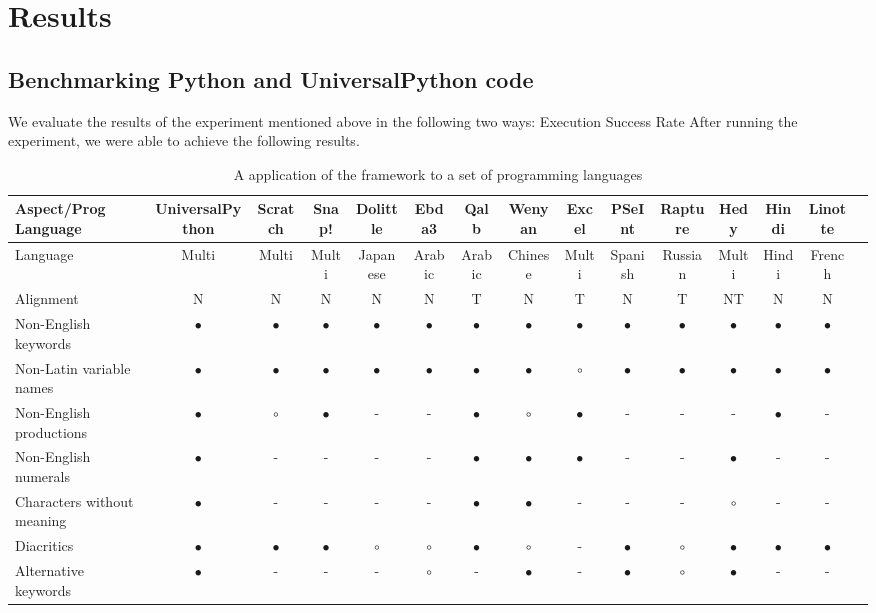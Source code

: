 \documentclass[conference]{IEEEtran}
\begin{document}
\section{Results}


\subsection{Benchmarking Python and UniversalPython code}

We evaluate the results of the experiment mentioned above in the following two ways:
Execution Success Rate After running the experiment, we were able to achieve the following results.


\begin{table}[t]
    \caption{A application of the framework to a set of programming languages}
    \centering
    \begin{tabularx}{\textwidth}{l *{14}{c}}
    \hline
    Aspect/Prog Language & UniversalPython & Scratch & Snap! & Dolittle & Ebda3 & Qalb & Wenyan & Excel & PSeInt & Rapture & Hedy & Hindi & Linotte \\
    \hline
    Language & Multi & Multi & Multi & Japanese & Arabic & Arabic & Chinese & Multi & Spanish & Russian & Multi & Hindi & French \\
    Alignment & N & N & N & N & N & T & N & T & N & T & NT & N & N \\
    Non-English keywords & $\bullet$ & $\bullet$ & $\bullet$ & $\bullet$ & $\bullet$ & $\bullet$ & $\bullet$ & $\bullet$ & $\bullet$ & $\bullet$ & $\bullet$ & $\bullet$ & $\bullet$ \\
    Non-Latin variable names & $\bullet$ & $\bullet$ & $\bullet$ & $\bullet$ & $\bullet$ & $\bullet$ & $\bullet$ & $\circ$ & $\bullet$ & $\bullet$ & $\bullet$ & $\bullet$ & $\bullet$ \\
    Non-English productions & $\bullet$ & $\circ$ & $\bullet$ & - & - & $\bullet$ & $\circ$ & $\bullet$ & - & - & - & $\bullet$ & - \\
    Non-English numerals & $\bullet$ & - & - & - & - & $\bullet$ & $\bullet$ & $\bullet$ & - & - & $\bullet$ & - & - \\
    Characters without meaning & $\bullet$ & - & - & - & - & $\bullet$ & $\bullet$ & - & - & - & $\circ$ & - & - \\
    Diacritics & $\bullet$ & $\bullet$ & $\bullet$ & $\circ$ & $\circ$ & $\bullet$ & $\circ$ & - & $\bullet$ & $\circ$ & $\bullet$ & $\bullet$ & $\bullet$ \\
    Alternative keywords & $\bullet$ & - & - & - & $\circ$ & - & $\bullet$ & - & $\bullet$ & $\circ$ & $\bullet$ & - & - \\

\end{tabularx}
\end{table}
\end{document}
